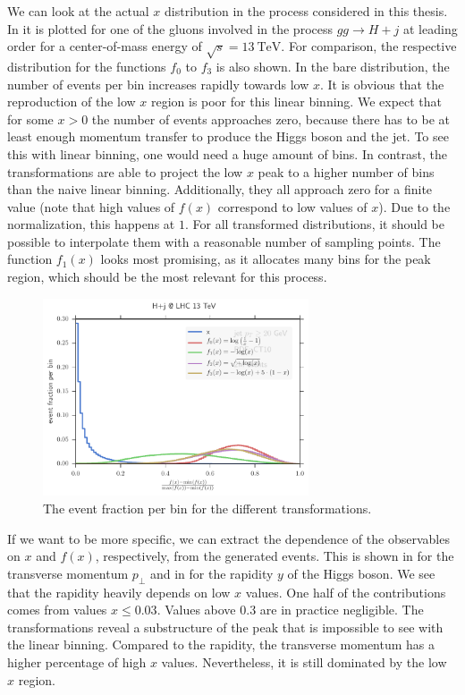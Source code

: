 We can look at the actual $x$ distribution in the process considered in this thesis.
In  it is plotted for one of the gluons involved in the process $gg \rightarrow H + j$ at leading order for a center-of-mass energy of $\sqrt{s} = \SI{13}{\tera\electronvolt}$.
For comparison, the respective distribution for the functions $f_0$ to $f_3$ is also shown.
In the bare distribution, the number of events per bin increases rapidly towards low $x$.
It is obvious that the reproduction of the low $x$ region is poor for this linear binning.
We expect that for some $x>0$ the number of events approaches zero, because there has to be at least enough momentum transfer to produce the Higgs boson and the jet.
To see this with linear binning, one would need a huge amount of bins.
In contrast, the transformations are able to project the low $x$ peak to a higher number of bins than the naive linear binning.
Additionally, they all approach zero for a finite value (note that high values of $f(x)$ correspond to low values of $x$).
Due to the normalization, this happens at $1$.
For all transformed distributions, it should be possible to interpolate them with a reasonable number of sampling points.
The function $f_1(x)$ looks most promising, as it allocates many bins for the peak region, which should be the most relevant for this process.

%
\begin{figure}[]
	\includegraphics[width=0.7\textwidth]{images/x_compare.pdf}
	\caption{The event fraction per bin for the different transformations.}
	\label{fig:x_compare}
\end{figure}
%

If we want to be more specific, we can extract the dependence of the observables on $x$ and $f(x)$, respectively, from the generated events.
This is shown in  for the transverse momentum $p_\perp$ and in  for the rapidity $y$ of the Higgs boson.
We see that the rapidity heavily depends on low $x$ values.
One half of the contributions comes from values $x \leq \num{0.03}$.
Values above \num{0.3} are in practice negligible.
The transformations reveal a substructure of the peak that is impossible to see with the linear binning.
Compared to the rapidity, the transverse momentum has a higher percentage of high $x$ values.
Nevertheless, it is still dominated by the low $x$ region.


